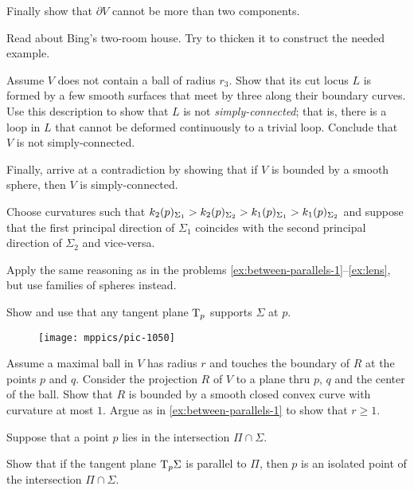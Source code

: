 Finally show that $\partial V$ cannot be more than two components.

Read about Bing's two-room house.
Try to thicken it to construct the needed example.

Assume $V$ does not contain a ball of radius $r_3$.
Show that its cut locus $L$ is formed by a few smooth surfaces that meet by three along their boundary curves.
Use this description to show that $L$ is not \emph{simply-connected}; that is, there is a loop in $L$ that cannot be deformed continuously to a trivial loop.
Conclude that $V$ is not simply-connected.

Finally, arrive at a contradiction by showing that if $V$ is bounded by a smooth sphere, then $V$ is simply-connected. 

\setcounter{eqtn}{0}

Choose curvatures such that 
$k_2(p)_{\Sigma_1}\z>k_2(p)_{\Sigma_2}> k_1(p)_{\Sigma_1}> k_1(p)_{\Sigma_2}$ and suppose that the first principal direction of $\Sigma_1$ coincides with the second principal direction of $\Sigma_2$ and vice-versa.

 Apply the same reasoning as in the problems \ref{ex:between-parallels-1}--\ref{ex:lens}, but use families of spheres instead.


 Show and use that any tangent plane $\mathrm{T}_p$ supports $\Sigma$ at $p$.

{

\begin{wrapfigure}{r}{25 mm}
\vskip-8mm
\centering
\texttt{[image: mppics/pic-1050]}
\vskip-0mm
\end{wrapfigure}

Assume a maximal ball in $V$ has radius $r$ and touches the boundary of $R$ at the points $p$ and $q$.
Consider the projection $R$ of $V$ to a plane thru $p$, $q$ and the center of the ball.
Show that $R$ is bounded by a smooth closed convex curve with curvature at most $1$.
Argue as in \ref{ex:between-parallels-1} to
show that $r\ge 1$.

}
 

Suppose that a point $p$ lies in the intersection $\Pi\cap\Sigma$.

Show that if the tangent plane $\mathrm{T}_p\Sigma$ is parallel to $\Pi$,
then $p$ is an isolated point of the intersection $\Pi\cap\Sigma$.

